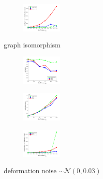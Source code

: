 \documentclass[hyperref={pdfpagelabels=false}]{beamer}
\begin{document}
\begin{frame}[allowframebreaks]
\begin{figure}[h]
\begin{subfigure}[b]{0.32\textwidth}
		\end{subfigure} 
		\begin{subfigure}[b]{0.32\textwidth}
			\centering
			\includegraphics[width=2.0cm]{"fig/evaluation/SyntheticTest_BigGraphs/descr/Results_v4.3.3/Test1/time_summary_avg1t"} 
		\end{subfigure} 	\vspace{-10pt}
	\caption*{\tiny graph isomorphism}
\end{figure}
\vspace{-20pt}
\begin{figure}[h] 
		\begin{subfigure}[b]{0.32\textwidth}
			\centering
			\includegraphics[width=2.0cm]{"fig/evaluation/SyntheticTest_BigGraphs/descr/Results_v4.3.3/Test2/accuracy_avg1t"} 
		\end{subfigure}
		\begin{subfigure}[b]{0.32\textwidth}
			\centering
			\includegraphics[width=2.0cm]{"fig/evaluation/SyntheticTest_BigGraphs/descr/Results_v4.3.3/Test2/score_avg1t"} 
		\end{subfigure} 
		\begin{subfigure}[b]{0.32\textwidth}
			\centering
			\includegraphics[width=2.0cm]{"fig/evaluation/SyntheticTest_BigGraphs/descr/Results_v4.3.3/Test2/time_summary_avg1t"} 
		\end{subfigure} 	\vspace{-10pt}
	\caption*{\tiny deformation noise $\sim\mathcal{N}(0, 0.03)$}
\end{figure}
\vspace{-20pt}
\begin{figure}[h] 
		\begin{subfigure}[b]{0.32\textwidth}
			\centering

\end{subfigure}
\end{figure}
\end{frame}
\end{document}
